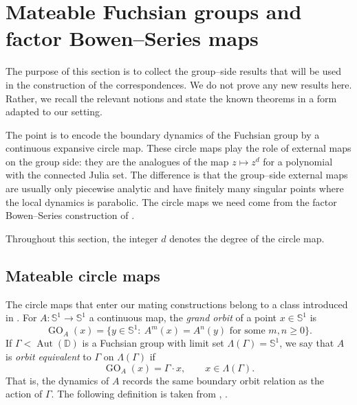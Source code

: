 \documentclass[11pt,a4paper, oneside]{amsart}
\theoremstyle{definition}
\theoremstyle{remark}
\DeclareMathOperator{\Aut}{Aut}
\numberwithin{equation}{section}
\def\D{{\mathbb{D}}}
\renewcommand{\ge}{\geqslant}
\newcommand{\Circle}{{{\mathbb S}^1}}
\begin{document}
\section{Mateable Fuchsian groups and factor Bowen--Series maps}
\label{Sec:MateableGroups}

The purpose of this section is to collect the group--side results that will be
used in the construction of the correspondences.  We do not prove any new
results here.  Rather, we recall the relevant notions and state the known
theorems in a form adapted to our setting.  

The point is to encode the boundary
dynamics of the Fuchsian group by a continuous expansive circle map. These circle maps play the role of external maps on the group side: they are the analogues of the map $z\mapsto z^d$ for a polynomial with the connected Julia set. The difference is that
the group--side external maps are usually only piecewise analytic and have
finitely many singular points where the local dynamics is parabolic. The circle maps we need come from the factor Bowen--Series construction of \cite{MM, MM_survey}.  

Throughout this section, the integer $d$ denotes the degree of the circle map.



\subsection{Mateable circle maps}
\label{SSec:MateableCircleMaps}

The circle maps that enter our mating constructions belong to a class
introduced in \cite[\S2]{MM_survey}.  For $A:\Circle\to\Circle$ a continuous
map, the \emph{grand orbit} of a point $x\in\Circle$ is
\[
\operatorname{GO}_A(x)
=
\{y\in\Circle:\ A^m(x)=A^n(y)\text{ for some }m,n\ge0\}.
\]
If $\Gamma<\Aut(\D)$ is a Fuchsian group with limit set
$\Lambda(\Gamma)=\Circle$, we say that $A$ is \emph{orbit equivalent} to
$\Gamma$ on $\Lambda(\Gamma)$ if
\[
\operatorname{GO}_A(x)=\Gamma\cdot x,
\qquad
x\in\Lambda(\Gamma).
\]
That is, the dynamics of $A$ records the same boundary orbit relation as the
action of $\Gamma$. The following definition is taken from \cite[Definition~2.1]{MM_survey}, \cite[Definition~2.10]{MM24}.
\end{document}
